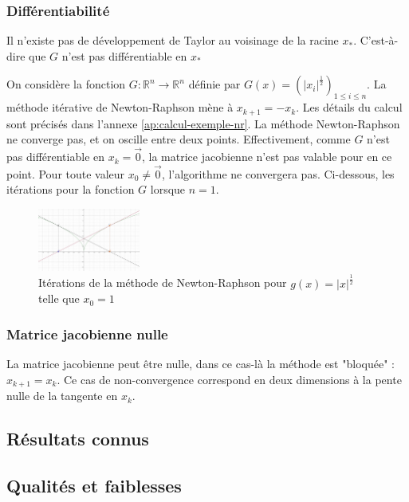 \documentclass[3p, twocolumn]{elsarticle}
\begin{document}
\subsubsection{Différentiabilité}
Il n'existe pas de développement de Taylor au voisinage de la racine $x_*$. C'est-à-dire que $G$ n'est pas différentiable en $x_*$          
\begin{exemple}
    On considère la fonction $G:\mathbb R^n\rightarrow \mathbb R^n$ définie par $G(x)=\left(\lvert x_i\rvert^{\frac12}\right)_{1\leq i\leq n}$. La méthode itérative de Newton-Raphson mène à $x_{k+1}=-x_k$. Les détails du calcul sont précisés dans l'annexe \ref{ap:calcul-exemple-nr}.
    \label{ex:newton-raphson-non-differentiable}    
    La méthode Newton-Raphson ne converge pas, et on oscille entre deux points. Effectivement, comme $G$ n'est pas différentiable en $x_k=\overrightarrow 0$, la matrice jacobienne n'est pas valable pour en ce point. Pour toute valeur $x_0\neq \overrightarrow 0$, l'algorithme ne convergera pas. Ci-dessous, les itérations pour la fonction $G$ lorsque $n=1$.
    \begin{figure}[htbp]
        \centering
        \includegraphics[width = 0.3\textwidth]{iteration-newton-2.png}
        \caption{Itérations de la méthode de Newton-Raphson pour $g(x) = \lvert x \rvert ^{\frac12}$ telle que $x_0 = 1$}
        \label{fig:nr-iterations-2}
    \end{figure}
\end{exemple}

\subsubsection{Matrice jacobienne nulle}
La matrice jacobienne peut être nulle, dans ce cas-là la méthode est "bloquée" : $x_{k+1} = x_k$. Ce cas de non-convergence correspond en deux dimensions à la pente nulle de la tangente en $x_k$.

\subsection{Résultats connus}


\subsection{Qualités et faiblesses}
\end{document}

